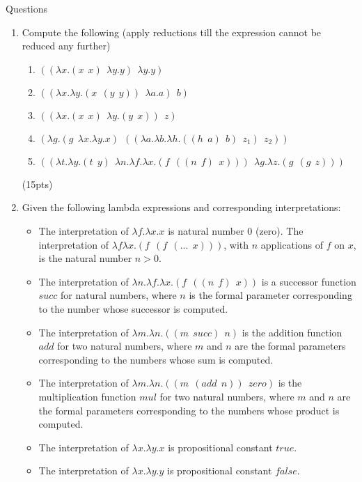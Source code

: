 \documentclass[11pt]{article}
\newcommand{\lmda}[2]{\lambda #1.#2}
\newcommand{\appl}[2]{(#1\ \ #2)}
\begin{document}
\noindent
\colorbox{timberwolf}{Questions}
\begin{enumerate}
\item Compute the following (apply reductions till the
expression cannot be reduced any further)
\begin{enumerate}

\item 
$\appl{\appl{\lmda{x}{\appl{x}{x}}}{\lmda{y}{y}}}{\lmda{y}{y}}$

\item 
$\appl{\appl{\lmda{x}{\lmda{y}{\appl{x}{\appl{y}{y}}}}}{\lmda{a}{a}}}{b}$

\item 
$\appl{\appl{\lmda{x}{\appl{x}{x}}}{\lmda{y}{\appl{y}{x}}}}{z}$

\item
$\appl{\lmda{g}{\appl{g}{\lmda{x}{\lmda{y}{x}}}}}{\appl{\appl{\lmda{a}{\lmda{b}{\lmda{h}{\appl{\appl{h}{a}}{b}}}}}{z_1}}{z_2}}$

\item
$\appl{\appl{\lmda{t}{\lmda{y}{\appl{t}{y}}}}{\lmda{n}{\lmda{f}{\lmda{x}{\appl{f}{\appl{\appl{n}{f}}{x}}}}}}}{\lmda{g}{\lmda{z}{\appl{g}{\appl{g}{z}}}}}$

\end{enumerate}
\hfill (15pts)

\item 
Given the following lambda expressions and corresponding
interpretations:
\begin{itemize}
\item The interpretation of $\lmda{f}{\lmda{x}{x}}$ is natural number
  $0$ (zero). The interpretation of
  $\lambda{f}{\lmda{x}{\appl{f}{\appl{f}{\appl{...}{x}}}}}$, with $n$
  applications of $f$ on $x$, is the natural number $n>0$.
\item The interpretation of
  $\lmda{n}{\lmda{f}{\lmda{x}{\appl{f}{\appl{\appl{n}{f}}{x}}}}}$ is a
  successor function $succ$ for natural numbers, where $n$ is the
  formal parameter corresponding to the number whose successor is
  computed.
\item The interpretation of
  $\lmda{m}{\lmda{n}{\appl{\appl{m}{succ}}{n}}}$
  is the addition function $add$ for two natural numbers, where $m$
  and $n$ are the formal parameters corresponding to the numbers whose
  sum is computed.
\item The interpretation of 
 $\lmda{m}{\lmda{n}{\appl{\appl{m}{\appl{add}{n}}}{zero}}}$
is the multiplication function $mul$ for two natural numbers, where $m$
  and $n$ are the formal parameters corresponding to the numbers whose
  product is computed.
\item The interpretation of $\lmda{x}{\lmda{y}{x}}$ is propositional constant $true$.
\item The interpretation of $\lmda{x}{\lmda{y}{y}}$ is propositional constant $false$.


\end{itemize}
\end{enumerate}
\end{document}
